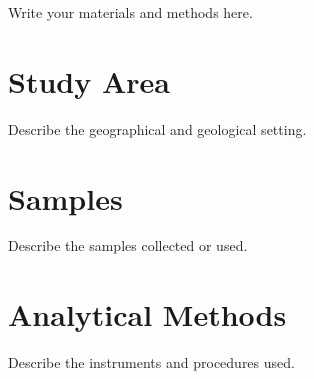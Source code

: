 

Write your materials and methods here.

\section{Study Area}

Describe the geographical and geological setting.


\section{Samples}

Describe the samples collected or used.


\section{Analytical Methods}

Describe the instruments and procedures used.

